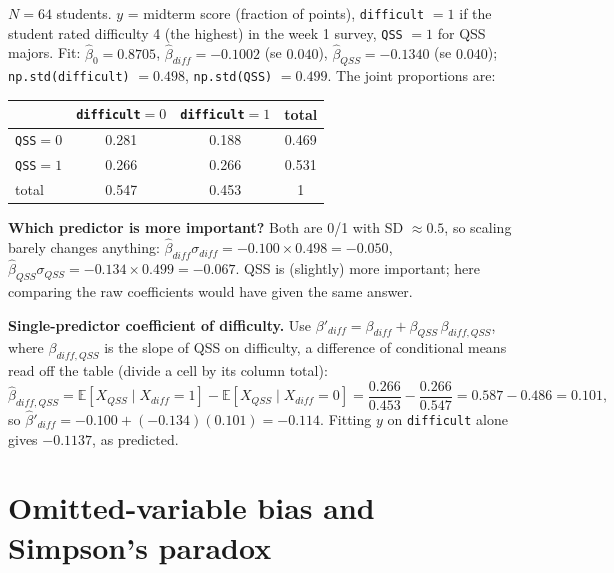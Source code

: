 \documentclass[11pt]{article}
\newcommand{\E}{\mathbb{E}}
\newcommand{\given}{\mid}
\newcommand{\py}[1]{\texttt{#1}}
\begin{document}
\begin{examplebox}[title={Question (10/12): midterm scores, difficulty, and QSS}]
$N=64$ students. $y$ = midterm score (fraction of points), \py{difficult} $=1$ if the student rated difficulty 4 (the highest) in the week 1
survey, \py{QSS} $=1$ for QSS majors. Fit: $\hat\beta_0=0.8705$, $\hat\beta_{diff}=-0.1002$ (se $0.040$), $\hat\beta_{QSS}=-0.1340$ (se $0.040$);
\py{np.std(difficult)} $=0.498$, \py{np.std(QSS)} $=0.499$. The joint proportions are:
\begin{center}
\begin{tabular}{lccc}
\toprule
 & \py{difficult}$=0$ & \py{difficult}$=1$ & total\\\midrule
\py{QSS}$=0$ & 0.281 & 0.188 & 0.469\\
\py{QSS}$=1$ & 0.266 & 0.266 & 0.531\\\midrule
total & 0.547 & 0.453 & 1\\
\bottomrule
\end{tabular}
\end{center}
\textbf{Which predictor is more important?} Both are 0/1 with SD $\approx0.5$, so scaling barely changes anything:
$\hat\beta_{diff}\sigma_{diff}=-0.100\times0.498=-0.050$, $\hat\beta_{QSS}\sigma_{QSS}=-0.134\times0.499=-0.067$. QSS is (slightly) more important;
here comparing the raw coefficients would have given the same answer.

\textbf{Single-predictor coefficient of difficulty.} Use $\beta'_{diff}=\beta_{diff}+\beta_{QSS}\,\beta_{diff,QSS}$, where $\beta_{diff,QSS}$
is the slope of QSS on difficulty, a difference of conditional means read off the table (divide a cell by its column total):
\[
\hat\beta_{diff,QSS}=\E[X_{QSS}\given X_{diff}{=}1]-\E[X_{QSS}\given X_{diff}{=}0]=\frac{0.266}{0.453}-\frac{0.266}{0.547}=0.587-0.486=0.101,
\]
so $\hat\beta'_{diff}=-0.100+(-0.134)(0.101)=-0.114$. Fitting $y$ on \py{difficult} alone gives $-0.1137$, as predicted.
\end{examplebox}

\section{Omitted-variable bias and Simpson's paradox}\label{sec:ovb}
\end{document}
